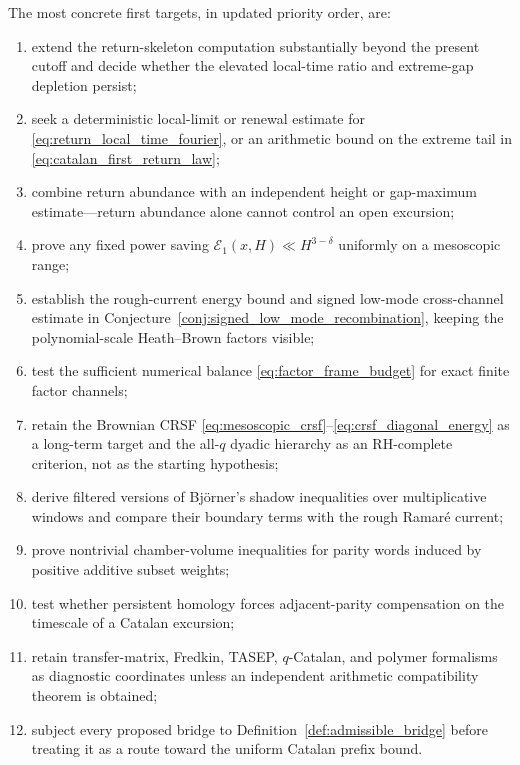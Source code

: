 \documentclass[11pt]{amsart}
\numberwithin{equation}{section}
\theoremstyle{plain}
\theoremstyle{definition}
\theoremstyle{remark}
\begin{document}
The most concrete first targets, in updated priority order, are:
\begin{enumerate}[label=(\roman*)]
\item extend the return-skeleton computation substantially beyond the present
      cutoff and decide whether the elevated local-time ratio and extreme-gap
      depletion persist;
\item seek a deterministic local-limit or renewal estimate for
      \eqref{eq:return_local_time_fourier}, or an arithmetic bound on the
      extreme tail in \eqref{eq:catalan_first_return_law};
\item combine return abundance with an independent height or gap-maximum
      estimate---return abundance alone cannot control an open excursion;
\item prove any fixed power saving
      $\mathcal E_1(x,H)\ll H^{3-\delta}$ uniformly on a mesoscopic range;
\item establish the rough-current energy bound and signed low-mode
      cross-channel estimate in
      Conjecture~\ref{conj:signed_low_mode_recombination}, keeping the
      polynomial-scale Heath--Brown factors visible;
\item test the sufficient numerical balance
      \eqref{eq:factor_frame_budget} for exact finite factor channels;
\item retain the Brownian CRSF
      \eqref{eq:mesoscopic_crsf}--\eqref{eq:crsf_diagonal_energy} as a
      long-term target and the all-$q$ dyadic hierarchy as an RH-complete
      criterion, not as the starting hypothesis;
\item derive filtered versions of Bj\"orner's shadow inequalities over
      multiplicative windows and compare their boundary terms with the rough
      Ramar\'e current;
\item prove nontrivial chamber-volume inequalities for parity words induced
      by positive additive subset weights;
\item test whether persistent homology forces adjacent-parity compensation on
      the timescale of a Catalan excursion;
\item retain transfer-matrix, Fredkin, TASEP, $q$-Catalan, and polymer
      formalisms as diagnostic coordinates unless an independent arithmetic
      compatibility theorem is obtained;
\item subject every proposed bridge to Definition~\ref{def:admissible_bridge}
      before treating it as a route toward the uniform Catalan prefix bound.
\end{enumerate}
\end{document}
